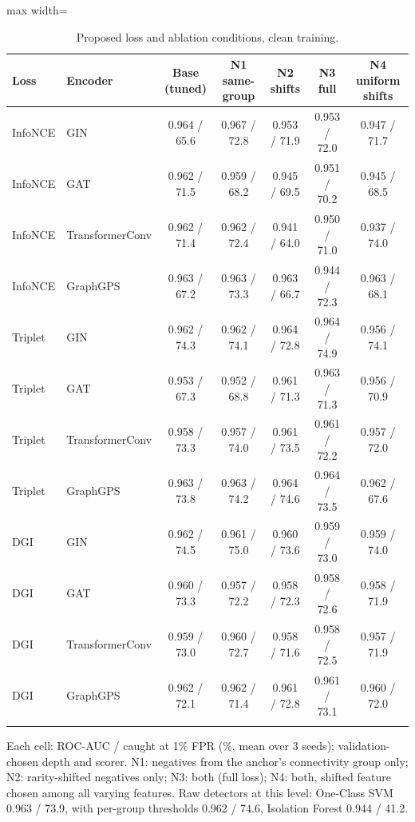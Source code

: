 \begin{table}[htbp]
\centering
\footnotesize
\caption{Proposed loss and ablation conditions, clean training.}
\label{tab:newloss-clean}
\begin{adjustbox}{max width=\linewidth}
\begin{tabular}{llccccc}
\toprule
Loss & Encoder & Base (tuned) & N1 same-group & N2 shifts & N3 full & N4 uniform shifts \\
\midrule
InfoNCE & GIN & 0.964 / 65.6 & 0.967 / 72.8 & 0.953 / 71.9 & 0.953 / 72.0 & 0.947 / 71.7 \\
InfoNCE & GAT & 0.962 / 71.5 & 0.959 / 68.2 & 0.945 / 69.5 & 0.951 / 70.2 & 0.945 / 68.5 \\
InfoNCE & TransformerConv & 0.962 / 71.4 & 0.962 / 72.4 & 0.941 / 64.0 & 0.950 / 71.0 & 0.937 / 74.0 \\
InfoNCE & GraphGPS & 0.963 / 67.2 & 0.963 / 73.3 & 0.963 / 66.7 & 0.944 / 72.3 & 0.963 / 68.1 \\
\addlinespace
Triplet & GIN & 0.962 / 74.3 & 0.962 / 74.1 & 0.964 / 72.8 & 0.964 / 74.9 & 0.956 / 74.1 \\
Triplet & GAT & 0.953 / 67.3 & 0.952 / 68.8 & 0.961 / 71.3 & 0.963 / 71.3 & 0.956 / 70.9 \\
Triplet & TransformerConv & 0.958 / 73.3 & 0.957 / 74.0 & 0.961 / 73.5 & 0.961 / 72.2 & 0.957 / 72.0 \\
Triplet & GraphGPS & 0.963 / 73.8 & 0.963 / 74.2 & 0.964 / 74.6 & 0.964 / 73.5 & 0.962 / 67.6 \\
\addlinespace
DGI & GIN & 0.962 / 74.5 & 0.961 / 75.0 & 0.960 / 73.6 & 0.959 / 73.0 & 0.959 / 74.0 \\
DGI & GAT & 0.960 / 73.3 & 0.957 / 72.2 & 0.958 / 72.3 & 0.958 / 72.6 & 0.958 / 71.9 \\
DGI & TransformerConv & 0.959 / 73.0 & 0.960 / 72.7 & 0.958 / 71.6 & 0.958 / 72.5 & 0.957 / 71.9 \\
DGI & GraphGPS & 0.962 / 72.1 & 0.962 / 71.4 & 0.961 / 72.8 & 0.961 / 73.1 & 0.960 / 72.0 \\
\addlinespace
\bottomrule
\end{tabular}
\end{adjustbox}
\par\smallskip
\parbox{0.95\linewidth}{\footnotesize Each cell: ROC-AUC / caught at 1\% FPR (\%, mean over 3 seeds); validation-chosen depth and scorer. N1: negatives from the anchor's connectivity group only; N2: rarity-shifted negatives only; N3: both (full loss); N4: both, shifted feature chosen among all varying features. Raw detectors at this level: One-Class SVM 0.963 / 73.9, with per-group thresholds 0.962 / 74.6, Isolation Forest 0.944 / 41.2.}
\end{table}
